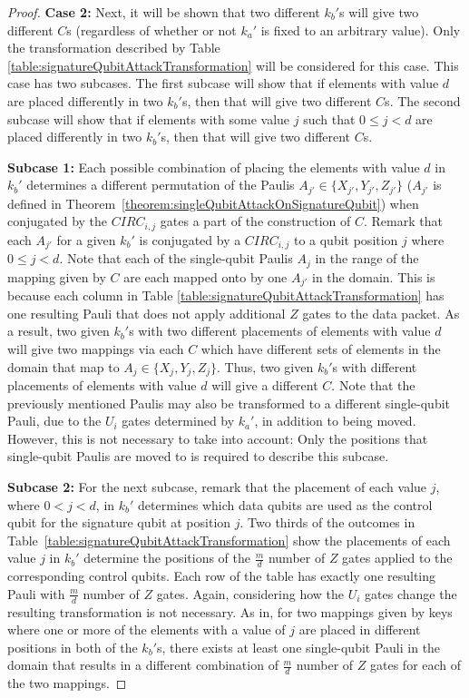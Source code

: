 \begin{proof}
\textbf{Case 2:} Next, it will be shown that two different $k_b'$s will give two different $C$s (regardless of whether or not $k_a'$ is fixed to an arbitrary value). Only the transformation described by Table \ref{table:signatureQubitAttackTransformation} will be considered for this case. This case has two subcases. The first subcase will show that if elements with value $d$ are placed differently in two $k_b'$s, then that will give two different $C$s. The second subcase will show that if elements with some value $j$ such that $0 \leq j < d$ are placed differently in two $k_b'$s, then that will give two different $C$s.

\textbf{Subcase 1:} Each possible combination of placing the elements with value $d$ in $k_b'$ determines a different permutation of the Paulis $A_{j'} \in \{X_{j'}, Y_{j'}, Z_{j'}\}$ ($A_{j'}$ is defined in Theorem~\ref{theorem:singleQubitAttackOnSignatureQubit}) when conjugated by the $\mathit{CIRC}_{i,j}$ gates a part of the construction of $C$. Remark that each $A_{j'}$ for a given $k_b'$ is conjugated by a $\mathit{CIRC}_{i,j}$ to a qubit position $j$ where $0 \leq j < d$. Note that each of the single-qubit Paulis $A_j$ in the range of the mapping given by $C$ are each mapped onto by one $A_{j'}$ in the domain. This is because each column in Table \ref{table:signatureQubitAttackTransformation} has one resulting Pauli that does not apply additional $Z$ gates to the data packet. As a result, two given $k_b'$s with two different placements of elements with value $d$ will give two mappings via each $C$ which have different sets of elements in the domain that map to $A_{j} \in \{X_{j}, Y_{j}, Z_{j}\}$. Thus, two given $k_b'$s with different placements of elements with value $d$ will give a different $C$. Note that the previously mentioned Paulis may also be transformed to a different single-qubit Pauli, due to the $U_i$ gates determined by $k_a'$, in addition to being moved. However, this is not necessary to take into account: Only the positions that single-qubit Paulis are moved to is required to describe this subcase. 

\textbf{Subcase 2:} For the next subcase, remark that the placement of each value $j$, where  $0 < j < d$, in $k_b'$ determines which data qubits are used as the control qubit for the signature qubit at position $j$. Two thirds of the outcomes in Table~\ref{table:signatureQubitAttackTransformation} show the placements of each value $j$ in $k_b'$ determine the positions of the $\frac{m}{d}$ number of $Z$ gates applied to the corresponding control qubits. Each row of the table has exactly one resulting Pauli with $\frac{m}{d}$ number of $Z$ gates. Again, considering how the $U_i$ gates change the resulting transformation is not necessary. As in, for two mappings given by keys where one or more of the elements with a value of $j$ are placed in different positions in both of the $k_b'$s, there exists at least one single-qubit Pauli in the domain that results in a different combination of $\frac{m}{d}$ number of $Z$ gates for each of the two mappings.


\end{proof}
